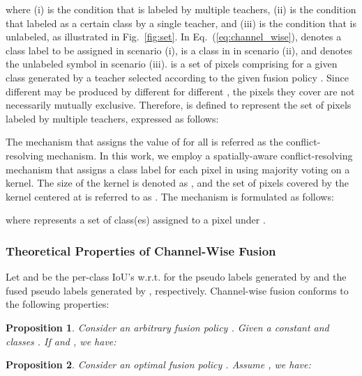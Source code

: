 \documentclass[final]{cvpr}
\newtheorem{prop}{Proposition}
\begin{document}
where (i) is the condition that  is labeled by multiple teachers, (ii) is the condition that  labeled as a certain class by a single teacher, and (iii) is the condition that  is unlabeled, as illustrated in Fig.~\ref{fig:set}. In Eq.~(\ref{eq:channel_wise}),  denotes a class label to be assigned in scenario (i),  is a class in  in scenario (ii), and  denotes the unlabeled symbol in scenario (iii).  is a set of pixels comprising   for a given class  generated by a teacher  selected according to the given fusion policy . Since different  may be produced by different  for different , the pixels they cover are not necessarily mutually exclusive. Therefore,  is defined to represent the set of pixels labeled by multiple teachers, expressed as follows:
\begin{spacing}{0.7}

\end{spacing} The mechanism that assigns the value of  for all  is referred as the conflict-resolving mechanism. In this work, we employ a spatially-aware conflict-resolving mechanism that assigns a class label for each pixel in  using majority voting on a kernel. The size of the kernel is denoted as , and the set of pixels covered by the kernel centered at  is referred to as . The mechanism is formulated as follows:
\vspace{-0.15em}

where  represents a set of class(es) assigned to a pixel  under .

\subsubsection{Theoretical Properties of Channel-Wise Fusion}
Let  and  be the per-class IoU's w.r.t.  for the pseudo labels generated by  and the fused pseudo labels generated by , respectively. Channel-wise fusion conforms to the following properties:

\begin{prop}
Consider an arbitrary fusion policy . Given a constant  and classes . If  and , we have:
\vspace{-0.2em}

\end{prop}

\vspace{-0.9em}

\begin{prop}
Consider an optimal fusion policy . Assume , we have:
\vspace{-0.2em}

\end{prop}
\end{document}
